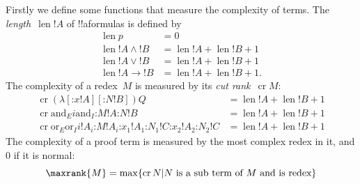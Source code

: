 \documentclass[10pt,a4paper]{article}
\theoremstyle{plain}
\theoremstyle{definition}
\theoremstyle{remark}
\providecommand{\lif}{\mathbin{\rightarrow}}
\providecommand{\lambd}{\ensuremath{\lambda}}
\providecommand{\ande}{\mathrm{and}_E}
\providecommand{\andi}{\mathrm{and}_I}
\providecommand{\ore}{\mathrm{or}_E}
\providecommand{\ori}{\mathrm{or}_I}
\providecommand{\typeof}{\mathord{:}}
\providecommand{\len}{\operatorname{len}}
\providecommand{\cutrank}{\operatorname{cr}}
\providecommand{\cutrank}{\operatorname{cr}}
\begin{document}
Firstly we define some functions that measure the complexity of terms.
The \emph{length}~$\len{!A}$ of !!a{formula}s is defined by
\begin{align*}
  \len{p} &= 0\\
  \len{!A \land !B} &= \len{!A} + \len{!B} + 1\\
  \len{!A \lor !B} &= \len{!A} + \len{!B} + 1 \\
  \len{!A \lif !B} &= \len{!A} + \len{!B} + 1.
\end{align*}
The complexity of a redex~$M$ is measured by its \emph{cut
  rank}~$\cutrank{M}$:
\begin{align*}
  \cutrank{(\lambd[\typeof{x}{!A}][\typeof{N}{!B}])Q} &=
  \len{!A} + \len{!B} + 1 \\
  \cutrank{\ande{i}{\andi{\typeof{M}{!A}}{\typeof{N}{!B}}}} &=
  \len{!A} + \len{!B} + 1 \\
  \cutrank{\ore{\ori{i}{!A_{i}}{\typeof{M}{!A_i}}}
    {\typeof{x_1}{!A_1}}{\typeof{N_1}{!C}}
    {\typeof{x_2}{!A_2}}{\typeof{N_2}{!C}}} &=
  \len{!A} + \len{!B} + 1
\end{align*}
The complexity of a proof term is measured by the most complex
redex in it, and $0$ if it is normal:
\[
  \maxrank{M} = \max \{\cutrank{N} | N \text{ is a sub term of } M \text{
    and is redex}\}
\]
\end{document}
